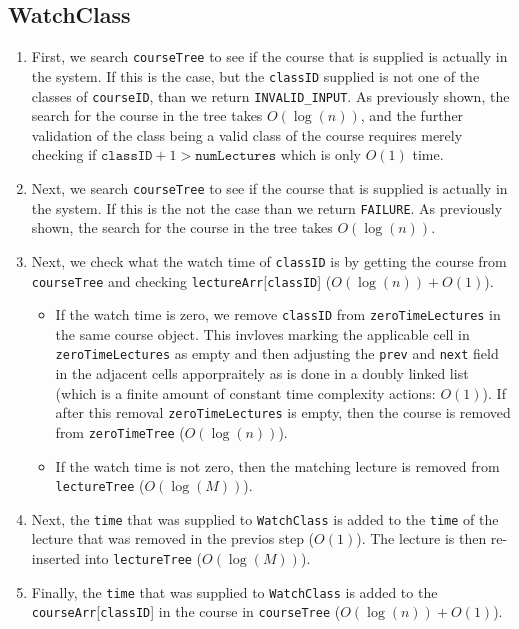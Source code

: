 \documentclass{article}
\begin{document}
    \subsection*{WatchClass}
        \begin{enumerate}
            \item First, we search \texttt{courseTree} to see if the course that is supplied 
                is actually in the system. If this is the case, but the \texttt{classID} supplied
                is not one of the classes of \texttt{courseID}, than we return \texttt{INVALID\_INPUT}.
                As previously shown, the search for the course in the tree takes $O(\log(n))$, and the further
                validation of the class being a valid class of the course requires merely checking if 
                $\texttt{classID}+1>\texttt{numLectures}$ which is only $O(1)$ time.
            \item Next, we search \texttt{courseTree} to see if the course that is supplied 
                is actually in the system. If this is the not the case than we return \texttt{FAILURE}.
                As previously shown, the search for the course in the tree takes $O(\log(n))$.
            \item Next, we check what the watch time of \texttt{classID} is by getting the course from 
                \texttt{courseTree} and checking \texttt{lectureArr}[\texttt{classID}] ($O(\log(n))+O(1)$).
                \begin{itemize}
                    \item If the watch time is zero, we remove \texttt{classID} from \texttt{zeroTimeLectures}
                    in the same course object. This invloves marking the applicable cell in \texttt{zeroTimeLectures}
                    as empty and then adjusting the \texttt{prev} and  \texttt{next} field in the adjacent cells apporpraitely
                    as is done in a doubly linked list (which is a finite amount of constant time complexity actions: $O(1)$).
                    If after this removal \texttt{zeroTimeLectures} is empty, then the course is removed from \texttt{zeroTimeTree}
                    ($O(\log(n))$). 
                    \item If the watch time is not zero, then the matching lecture is removed from \texttt{lectureTree} ($O(\log(M))$).
                \end{itemize}
            \item Next, the \texttt{time} that was supplied to \texttt{WatchClass} is added to the \texttt{time}
                 of the lecture that was removed in the previos step ($O(1)$). The lecture is then re-inserted
                 into \texttt{lectureTree} ($O(\log(M))$).
            \item Finally, the \texttt{time} that was supplied to \texttt{WatchClass} is added to the 
                \texttt{courseArr}[\texttt{classID}] in the course in \texttt{courseTree} ($O(\log(n))+O(1)$).
        \end{enumerate}
\end{document}
